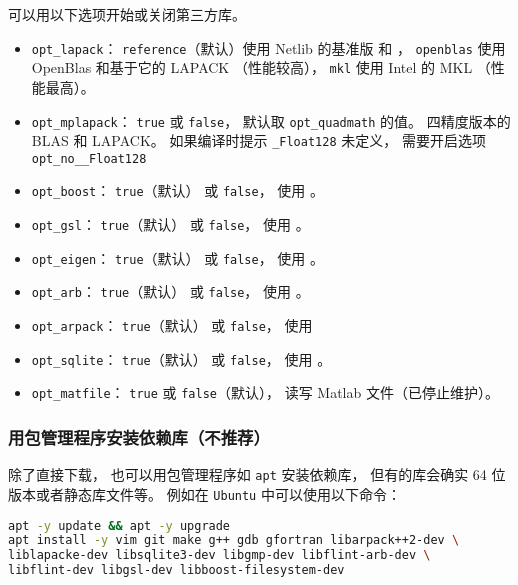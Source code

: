 可以用以下选项开始或关闭第三方库。
\begin{itemize}
\item \verb|opt_lapack|： \verb|reference|（默认）使用 Netlib 的基准版  和 ， \verb|openblas| 使用 OpenBlas 和基于它的 LAPACK （性能较高）， \verb|mkl| 使用 Intel 的 MKL （性能最高）。
\item \verb|opt_mplapack|： \verb|true| 或 \verb|false|， 默认取 \verb|opt_quadmath| 的值。 四精度版本的 BLAS 和 LAPACK。 如果编译时提示 \verb|_Float128| 未定义， 需要开启选项 \verb|opt_no__Float128|
\item \verb|opt_boost|： \verb|true|（默认） 或 \verb|false|， 使用 。
\item \verb|opt_gsl|： \verb|true|（默认） 或 \verb|false|， 使用 。
\item \verb|opt_eigen|： \verb|true|（默认） 或 \verb|false|， 使用 。
\item \verb|opt_arb|： \verb|true|（默认） 或 \verb|false|， 使用 。
\item \verb|opt_arpack|： \verb|true|（默认） 或 \verb|false|， 使用 
\item \verb|opt_sqlite|： \verb|true|（默认） 或 \verb|false|， 使用 。
\item \verb|opt_matfile|： \verb|true| 或 \verb|false|（默认）， 读写 Matlab 文件（已停止维护）。
\end{itemize}

\subsubsection{用包管理程序安装依赖库（不推荐）}
除了直接下载， 也可以用包管理程序如 \verb|apt| 安装依赖库， 但有的库会确实 64 位版本或者静态库文件等。 例如在 \verb|Ubuntu| 中可以使用以下命令： 
\begin{lstlisting}[language=bash]
apt -y update && apt -y upgrade
apt install -y vim git make g++ gdb gfortran libarpack++2-dev \
liblapacke-dev libsqlite3-dev libgmp-dev libflint-arb-dev \
libflint-dev libgsl-dev libboost-filesystem-dev
\end{lstlisting}
